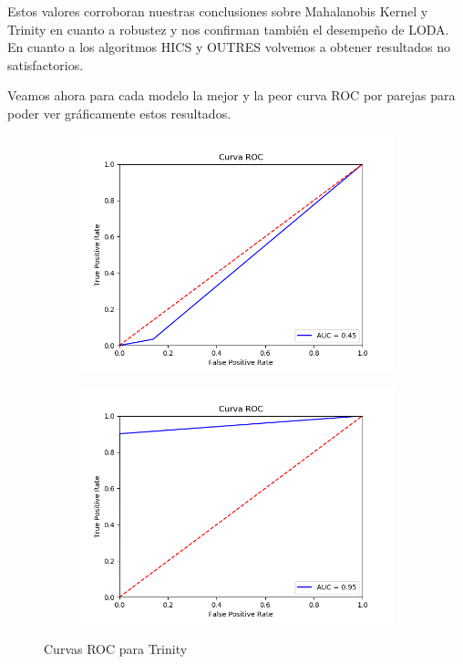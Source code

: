 Estos valores corroboran nuestras conclusiones sobre Mahalanobis Kernel y Trinity en cuanto a robustez y nos confirman también el desempeño de LODA. En cuanto a los algoritmos HICS y OUTRES volvemos a obtener resultados no satisfactorios.

Veamos ahora para cada modelo la mejor y la peor curva ROC por parejas para poder ver gráficamente estos resultados.

\begin{figure}[H]
	\centering
	\begin{subfigure}{.49\textwidth}
		\centering
		\includegraphics[scale=0.42]{imagenes/imgs-exp1/roc/TRINITY_vertebral}
	\end{subfigure}
	\begin{subfigure}{.49\textwidth}
		\centering
		\includegraphics[scale=0.42]{imagenes/imgs-exp1/roc/TRINITY_satimage-2}
	\end{subfigure}
	\caption{Curvas ROC para Trinity}
	\label{ROC_TRINITY}
\end{figure}

